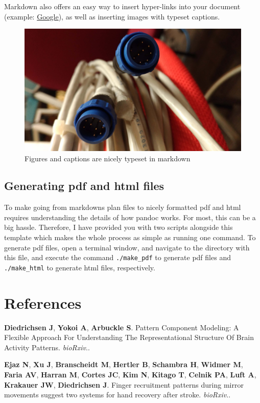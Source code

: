 \documentclass[letterpaper,11pt,twoside,onecolumn,notitlepage]{article}
\begin{document}
Markdown also offers an easy way to insert hyper-links into your
document (example: \href{http://www.google.com}{Google}), as well as
inserting images with typeset captions.

\begin{figure}
\centering
\includegraphics{img.jpg}
\caption{Figures and captions are nicely typeset in markdown}
\end{figure}

\hypertarget{generating-pdf-and-html-files}{%
\subsection{Generating pdf and html
files}\label{generating-pdf-and-html-files}}

To make going from markdowns plan files to nicely formatted pdf and html
requires understanding the details of how pandoc works. For most, this
can be a big hassle. Therefore, I have provided you with two scripts
alongside this template which makes the whole process as simple as
running one command. To generate pdf files, open a terminal window, and
navigate to the directory with this file, and execute the command
\texttt{./make\_pdf} to generate pdf files and \texttt{./make\_html} to
generate html files, respectively.

\hypertarget{references}{%
\section*{References}\label{references}}

\hypertarget{refs}{}
\leavevmode\hypertarget{ref-Diedrichsen:2017fy}{}%
\textbf{Diedrichsen J}, \textbf{Yokoi A}, \textbf{Arbuckle S}. Pattern
Component Modeling: A Flexible Approach For Understanding The
Representational Structure Of Brain Activity Patterns. \emph{bioRxiv}..

\leavevmode\hypertarget{ref-Ejaz:2017fo}{}%
\textbf{Ejaz N}, \textbf{Xu J}, \textbf{Branscheidt M}, \textbf{Hertler
B}, \textbf{Schambra H}, \textbf{Widmer M}, \textbf{Faria AV},
\textbf{Harran M}, \textbf{Cortes JC}, \textbf{Kim N}, \textbf{Kitago
T}, \textbf{Celnik PA}, \textbf{Luft A}, \textbf{Krakauer JW},
\textbf{Diedrichsen J}. Finger recruitment patterns during mirror
movements suggest two systems for hand recovery after stroke.
\emph{bioRxiv}..
\end{document}
